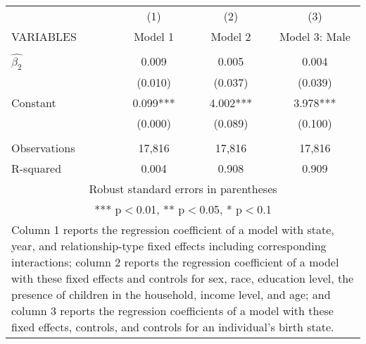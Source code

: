 \begin{tabular}{lccc}
\hline
 & (1) & (2) & (3) \\
VARIABLES & Model 1 & Model 2 & Model 3: Male \\ \hline
 &  &  &  \\
$\hat{\beta_2}$ & 0.009 & 0.005 & 0.004 \\
 & (0.010) & (0.037) & (0.039) \\
Constant & 0.099*** & 4.002*** & 3.978*** \\
 & (0.000) & (0.089) & (0.100) \\
 &  &  &  \\
Observations & 17,816 & 17,816 & 17,816 \\
 R-squared & 0.004 & 0.908 & 0.909 \\ \hline
\multicolumn{4}{c}{ Robust standard errors in parentheses} \\
\multicolumn{4}{c}{ *** p$<$0.01, ** p$<$0.05, * p$<$0.1} \\
\multicolumn{4}{p{0.6\linewidth}}{\footnotesize Column 1 reports the regression coefficient of a model with state, year, and relationship-type fixed effects including corresponding interactions; column 2 reports the regression coefficient of a model with these fixed effects and controls for sex, race, education level, the presence of children in the household, income level, and age; and column 3 reports the regression coefficients of a model with these fixed effects, controls, and controls for an individual’s birth state.} \\
\end{tabular}
